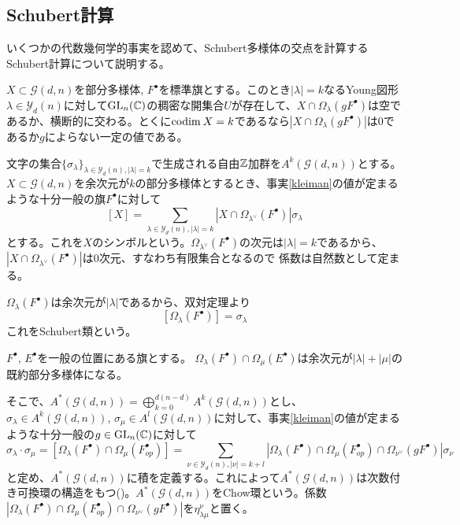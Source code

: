 \documentclass{ltjsreport}
\begin{document}
\subsection{Schubert計算}

いくつかの代数幾何学的事実を認めて、Schubert多様体の交点を計算するSchubert計算について説明する。

\begin{fact}\label{kleiman}
  $X\subset\mathcal{G}(d,n)$を部分多様体, $F^\bullet$を標準旗とする。このとき$|\lambda|=k$なるYoung図形$\lambda\in\mathcal{Y}_d(n)$に対して$\text{GL}_n(\mathbb{C})$の稠密な開集合$U$が存在して、$X\cap \Omega_{\lambda}(gF^\bullet)$は空であるか、横断的に交わる。とくに$\text{codim}\: X=k$であるなら$|X\cap \Omega_{\lambda}(gF^\bullet)|$は$0$であるか$g$によらない一定の値である。
\end{fact}

文字の集合$\{\sigma_\lambda\}_{\lambda\in\mathcal{Y}_d(n),|\lambda|=k}$で生成される自由$\mathbb{Z}$加群を$A^k(\mathcal{G}(d,n))$とする。$X\subset \mathcal{G}(d,n)$を余次元が$k$の部分多様体とするとき、事実\ref{kleiman}の値が定まるような十分一般の旗$F^\bullet$に対して
\[
[X]=\sum_{\lambda\in\mathcal{Y}_d(n),|\lambda|=k}|X\cap\Omega_{\lambda^\vee}(F^\bullet)|\sigma_\lambda  
\]
とする。これを$X$のシンボルという。$\Omega_{\lambda^\vee}(F^\bullet)$の次元は$|\lambda|=k$であるから、$|X\cap\Omega_{\lambda^\vee}(F^\bullet)|$は$0$次元、すなわち有限集合となるので
係数は自然数として定まる。

\begin{eg}
  $\Omega_{\lambda}(F^\bullet)$は余次元が$|\lambda|$であるから、双対定理より
  \[
    [\Omega_{\lambda}(F^\bullet)]=\sigma_{\lambda}
  \]
  これをSchubert類という。
\end{eg}

\begin{fact}
  $F^\bullet$, $E^\bullet$を一般の位置にある旗とする。
  $\Omega_{\lambda}(F^\bullet)\cap\Omega_{\mu}(E^\bullet)$は余次元が$|\lambda|+|\mu|$の既約部分多様体になる。
\end{fact}

そこで、$A^*(\mathcal{G}(d,n))=\bigoplus_{k=0}^{d(n-d)}A^k(\mathcal{G}(d,n))$とし、$\sigma_\lambda\in A^k(\mathcal{G}(d,n))$, $\sigma_\mu\in A^l(\mathcal{G}(d,n))$に対して、事実\ref{kleiman}の値が定まるような十分一般の$g\in\text{GL}_n(\mathbb{C})$に対して
\[
\sigma_\lambda\cdot\sigma_\mu
=[\Omega_{\lambda}(F^\bullet)\cap\Omega_{\mu}(F^\bullet_{op})]
=\sum_{\nu\in\mathcal{Y}_d(n),|\nu|=k+l}|\Omega_{\lambda}(F^\bullet)\cap\Omega_{\mu}(F^\bullet_{op})\cap\Omega_{\nu^\vee}(gF^\bullet)|\sigma_\nu
\]
と定め、$A^*(\mathcal{G}(d,n))$に積を定義する。これによって$A^*(\mathcal{G}(d,n))$は次数付き可換環の構造をもつ(\cite{3264})。$A^*(\mathcal{G}(d,n))$をChow環という。係数$|\Omega_{\lambda}(F^\bullet)\cap\Omega_{\mu}(F^\bullet_{op})\cap\Omega_{\nu^\vee}(gF^\bullet)|$を$\eta_{\lambda\mu}^\nu$と置く。
\end{document}
